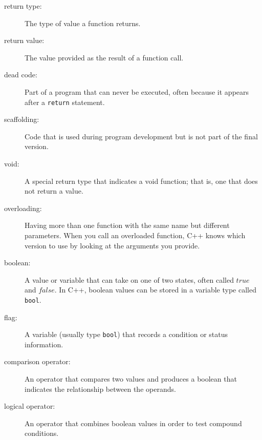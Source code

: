 \begin{description}

\item[return type:]  The type of value a function returns.

\item[return value:]  The value provided as the result of a function
call.

\item[dead code:]  Part of a program that can never be executed,
often because it appears after a {\tt return} statement.

\item[scaffolding:]  Code that is used during program development
but is not part of the final version.

\item[void:]  A special return type that indicates a void function;
that is, one that does not return a value.

\item[overloading:]  Having more than one function with the same name
but different parameters.  When you call an overloaded function,
C++ knows which version to use by looking at the arguments you
provide.

\item[boolean:]  A value or variable that can take on one of
two states, often called $true$ and $false$.  In C++, boolean
values can be stored in a variable type called {\tt bool}.

\item[flag:]  A variable (usually type {\tt bool}) that records
a condition or status information.

\item[comparison operator:]  An operator that compares two values
and produces a boolean that indicates the relationship between the
operands.

\item[logical operator:]  An operator that combines boolean values
in order to test compound conditions.


\end{description}

